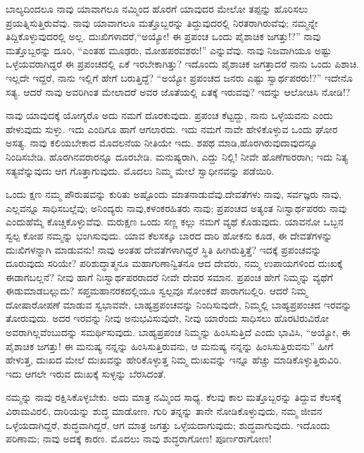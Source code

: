 ಬಾಲ್ಯದಿಂದಲೂ ನಾವು ಯಾವಾಗಲೂ ನಮ್ಮಿಂದ ಹೊರಗೆ ಯಾವುದರ ಮೇಲೋ ತಪ್ಪನ್ನು ಹೊರಿಸಲು ಪ್ರಯತ್ನಿಸುತ್ತಿರುವೆವು. ನಾವು ಯಾವಾಗಲೂ ಮತ್ತೊಬ್ಬರನ್ನು ತಿದ್ದುವುದರಲ್ಲಿ ನಿರತರಾಗಿರುವೆವು; ನಮ್ಮನ್ನೇ ತಿದ್ದಿಕೊಳ್ಳುವುದರಲ್ಲಿ ಅಲ್ಲ. ದುಃಖಿಗಳಾದರೆ,\break “ಅಯ್ಯೋ! ಈ ಪ್ರಪಂಚ ಒಂದು ಪೈಶಾಚಿಕ ಜಗತ್ತು!?” ನಾವು ಮತ್ತೊಬ್ಬರನ್ನು ದೂರಿ, “ಎಂತಹ ಮೂಢರು, ಮೋಹಪರವಶರು!'' ಎನ್ನುವೆವು. ನಾವು ನಿಜವಾಗಿಯೂ ಅಷ್ಟು ಒಳ್ಳೆಯವರಾಗಿದ್ದರೆ ಈ ಪ್ರಪಂಚದಲ್ಲಿ ಏಕೆ ಇರಬೇಕಾಗಿತ್ತು? ಇದೊಂದು ಪೈಶಾಚಿಕ ಜಗತ್ತಾದರೆ ನಾನು ಒಂದು ಪಿಶಾಚಿ. ಇಲ್ಲದೇ ಇದ್ದರೆ, ನಾನು ಇಲ್ಲಿಗೆ ಹೇಗೆ ಬರುತ್ತಿದ್ದೆ? “ಅಯ್ಯೋ ಪ್ರಪಂಚದ ಜನರು ಎಷ್ಟು ಸ್ವಾರ್ಥಪರರು!?” ಇದೇನೊ ಸತ್ಯ. ಆದರೆ ನಾವು ಅವರಿಗಿಂತ ಮೇಲಾದರೆ ಅವರ ಜೊತೆಯಲ್ಲಿ ಏತಕ್ಕೆ ಇರುವವು? ಇದನ್ನು ಆಲೋಚಿಸಿ ನೋಡಿ!?

ನಾವು ಯಾವುದಕ್ಕೆ ಯೋಗ್ಯರೊ ಅದು ನಮಗೆ ದೊರಕುವುದು. ಪ್ರಪಂಚ ಕೆಟ್ಟದ್ದು, ನಾನು ಒಳ್ಳೆಯವನು ಎಂದು ಹೇಳುವುದು ಸುಳ್ಳು. ಇದು ಎಂದಿಗೂ ಹಾಗೆ ಆಗಲಾರದು. ಇದು ನಮಗೆ ನಾವೇ ಹೇಳಿಕೊಳ್ಳುವ ಒಂದು ಘೋರ ಅಸತ್ಯ.
\newpage
ನಾವು ಕಲಿಯಬೇಕಾದ ಮೊದಲನೆಯ ನೀತಿಯೇ ಇದು. ಶಪಥ ಮಾಡಿ,\break ಹೊರಗಿರುವುದಾವುದನ್ನೂ ನಿಂದಿಸಬೇಡಿ. ಹೊರಗಿನವರಾರನ್ನೂ ದೂರಬೇಡಿ. ಮನುಷ್ಯರಾಗಿ, ಎದ್ದು ನಿಲ್ಲಿ! ನೀವೇ ಹೊಣೆಗಾರರಾಗಿ; ಇದು ನಿತ್ಯ ಸತ್ಯವೆನ್ನುವುದು ಆಗ ಗೊತ್ತಾಗುವುದು. ಮೊದಲು ನಿಮ್ಮ ಮೇಲೆ ಸ್ವಾಧೀನವನ್ನು ಪಡೆಯಿರಿ.

ಒಂದು ಕ್ಷಣ ನಮ್ಮ ಪೌರುಷವನ್ನು ಕುರಿತು ಅಷ್ಟೊಂದು ಮಾತನಾಡುವೆವು.\break ದೇವತೆಗಳು ನಾವು, ಸರ್ವಜ್ಞರು ನಾವು, ಎಲ್ಲವನ್ನೂ ಸಾಧಿಸಬಲ್ಲೆವು; ಅನಿಂದ್ಯರು ನಾವು,\break ಕಳಂಕರಹಿತರು ನಾವು; ಪ್ರಪಂಚದ ಅತ್ಯಂತ ನಿಃಸ್ವಾರ್ಥಪರರು ನಾವು ಎಂದು\break ಹೆಮ್ಮೆ ಕೊಚ್ಚಿಕೊಳ್ಳುವೆವು. ಮರುಕ್ಷಣ ಒಂದು ಸಣ್ಣ ಕಲ್ಲು ನಮಗೆ ವ್ಯಥೆ ಕೊಡುವುದು. ಯಾವನೋ ಒಬ್ಬನ ಸ್ವಲ್ಪ ಕೋಪ ನಮ್ಮನ್ನು ಭಂಗಿಸುವುದು. ಯಾವ ಕೆಲಸಕ್ಕೂ ಬಾರದ ದಾರಿ ಹೋಕನು ಕೂಡ, ಈ ದೇವತೆಗಳನ್ನು ದುಃಖಿಗಳನ್ನಾಗಿ ಮಾಡುವನು! ನಾವು ಅಂತಹ ದೇವತೆಗಳಾಗಿದ್ದರೆ ಸ್ಥಿತಿ ಹೀಗಿರುತ್ತಿತ್ತೆ? ಇದಕ್ಕೆ ಪ್ರಪಂಚವನ್ನು ದೂರುವುದು ಸರಿಯೇ? ಪರಿಶುದ್ಧಾತ್ಮನೂ ಮಹಾಗುಣಾನ್ವಿತನೂ ಆದ ದೇವರು, ನಮ್ಮ ಉಪಾಯಗಳಿಂದ ದುಃಖಕ್ಕೆ ಈಡಾಗಬಲ್ಲನೆ? ನೀವು ಹಾಗೆ ನಿಃಸ್ವಾರ್ಥಪರರಾದರೆ ನೀವೇ ದೇವರ ಸಮಾನ. ಪ್ರಪಂಚ ಹೇಗೆ ನಿಮ್ಮನ್ನು ವ್ಯಥೆಗೆ ಈಡುಮಾಡಬಲ್ಲುದು? ಸಪ್ತಮಹಾನರಕದಲ್ಲಿಯೂ ಸ್ವಲ್ಪವೂ ಸೋಂಕದೆ ಪಾರಾಗಬಲ್ಲಿರಿ. ಆದರೆ ನಿಮ್ಮ ದೋಷಾರೋಪಣೆ ಮಾಡುವ ಸ್ವಭಾವವೇ, ಬಾಹ್ಯಪ್ರಪಂಚವನ್ನು ನಿಂದಿಸುವುದೇ, ನಿಮ್ಮಲ್ಲಿ ಬಾಹ್ಯಪ್ರಪಂಚದ ಇರವನ್ನು ತೋರುವುದು. ಅದರ ಇರವನ್ನು ನೀವು ಅನುಭವಿಸುವುದೇ, ನೀವು ಯಾರೆಂದು ಸಾಧಿಸಲು ಹೊರಟಿರುವಿರೋ ಅವರಾಗಿಲ್ಲವೆಂಬುದನ್ನು ಸಮರ್ಥಿಸುವುದು. ಬಾಹ್ಯಪ್ರಪಂಚ ನಿಮ್ಮನ್ನು ಹಿಂಸಿಸುತ್ತಿದೆ ಎಂದು ಭಾವಿಸಿ, “ಅಯ್ಯೋ, ಈ ಪೈಶಾಚಿಕ ಜಗತ್ತು! ಈ ಮನುಷ್ಯ ನನ್ನನ್ನು ಹಿಂಸಿಸುತ್ತಿರುವನು, ಆ ಮನುಷ್ಯ ನನ್ನನ್ನು ಹಿಂಸಿಸುತ್ತಿರುವನು” ಹೀಗೆ ಹೇಳುತ್ತ, ದುಃಖದ ಮೇಲೆ ದುಃಖವನ್ನು ಹೇರಿಕೊಳ್ಳುತ್ತ ನಿಮ್ಮ ದುಃಖವನ್ನು ಇನ್ನೂ ಹೆಚ್ಚು ಮಾಡಿಕೊಳ್ಳುತ್ತಿರುವಿರಿ. ಇದು ಆಗಲೇ ಇರುವ ದುಃಖಕ್ಕೆ ಸುಳ್ಳನ್ನು ಬೆರಸಿದಂತೆ.

ನಮ್ಮನ್ನು ನಾವು ರಕ್ಷಿಸಿಕೊಳ್ಳಬೇಕು. ಅದು ಮಾತ್ರ ನಮ್ಮಿಂದ ಸಾಧ್ಯ. ಕೆಲವು ಕಾಲ ಮತ್ತೊಬ್ಬರನ್ನು ತಿದ್ದುವ ಕೆಲಸಕ್ಕೆ ವಿರಾಮವಿರಲಿ, ದಾರಿಯನ್ನು ಶುದ್ಧ ಮಾಡೋಣ. ಗುರಿ ತನ್ನನ್ನು ತಾನೇ ನೋಡಿಕೊಳ್ಳುವುದು, ನಮ್ಮ ಜೀವನ ಒಳ್ಳೆಯದಾಗಿದ್ದರೆ, ಶುದ್ಧವಾಗಿದ್ದರೆ, ಆಗ ಮಾತ್ರ ಜಗತ್ತು ಒಳ್ಳೆಯದಾಗುವುದು; ಶುದ್ಧವಾಗುವುದು. ಇದೊಂದು ಪರಿಣಾಮ; ನಾವು ಅದಕ್ಕೆ ಕಾರಣ. ಮೊದಲು ನಾವು ಶುದ್ಧರಾಗೋಣ! ಪೂರ್ಣರಾಗೋಣ!

